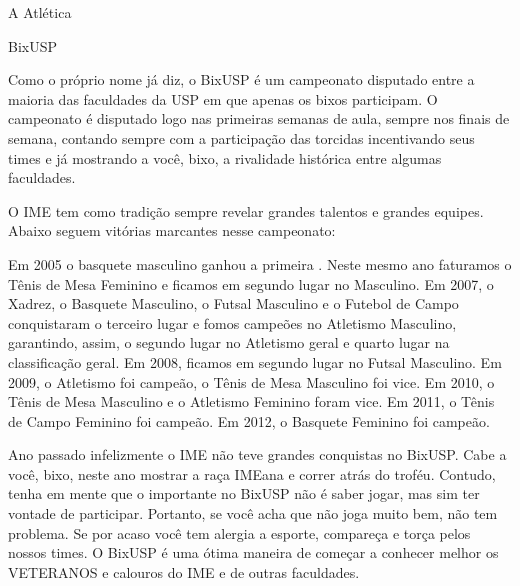 \begin{secao}{A Atlética}
\begin{subsecao}{BixUSP}

Como o próprio nome já diz, o BixUSP é um campeonato disputado entre a maioria
das faculdades da USP em que apenas os bixos participam. O campeonato é
disputado logo nas primeiras semanas de aula, sempre nos finais de semana, 
contando sempre com a participação das torcidas incentivando seus times 
e já mostrando a você, bixo, a rivalidade histórica entre algumas faculdades.

O IME tem como tradição sempre revelar grandes talentos e grandes equipes.
Abaixo seguem vitórias marcantes nesse campeonato:



Em 2005 o basquete masculino ganhou a primeira . Neste mesmo ano faturamos o Tênis
de Mesa Feminino e ficamos em segundo lugar no Masculino. Em 2007, o Xadrez, o 
Basquete Masculino, o Futsal Masculino e o Futebol de Campo conquistaram o 
terceiro lugar e fomos campeões no Atletismo Masculino, garantindo, assim, o 
segundo lugar no Atletismo geral e quarto lugar na classificação geral. Em 2008,
ficamos em segundo lugar no Futsal Masculino. Em 2009, o Atletismo foi campeão, 
o Tênis de Mesa Masculino foi vice. Em 2010, o Tênis de Mesa Masculino e o 
Atletismo Feminino foram vice. Em 2011, o Tênis de Campo Feminino foi campeão. 
Em 2012, o Basquete Feminino foi campeão.

Ano passado infelizmente o IME não teve grandes conquistas no BixUSP.
Cabe a você, bixo, neste ano mostrar a raça IMEana e correr atrás do troféu.
Contudo, tenha em mente que o importante no BixUSP não é saber jogar, 
mas sim ter vontade de participar.
Portanto, se você acha que não joga muito bem, não tem problema. Se por acaso
você tem alergia a esporte, compareça e torça pelos nossos times. O BixUSP é uma
ótima maneira de começar a conhecer melhor os VETERANOS e calouros do
IME e de outras faculdades.


\end{subsecao}
\end{secao}
